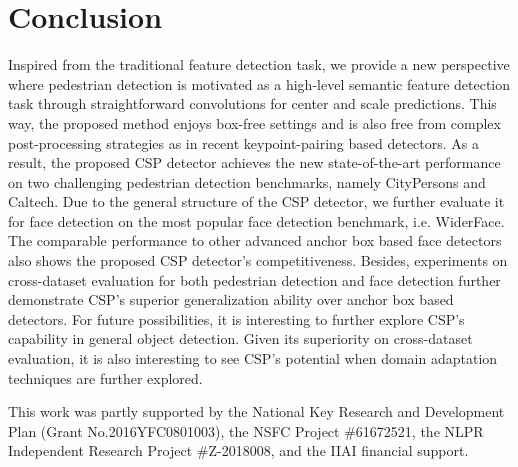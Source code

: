 \section{Conclusion}
Inspired from the traditional feature detection task, we provide a new perspective where pedestrian detection is motivated as a high-level semantic feature detection task through straightforward convolutions for center and scale predictions. This way, the proposed method enjoys box-free settings and is also free from complex post-processing strategies as in recent keypoint-pairing based detectors. As a result, the proposed CSP detector achieves the new state-of-the-art performance on two challenging pedestrian detection benchmarks, namely CityPersons and Caltech.
Due to the general structure of the CSP detector, we further evaluate it for face detection on the most popular face detection benchmark, i.e. WiderFace. The comparable performance to other advanced anchor box based face detectors also shows the proposed CSP detector's competitiveness. Besides, experiments on cross-dataset evaluation for both pedestrian detection and face detection further demonstrate CSP's superior generalization ability over anchor box based detectors. For future possibilities, it is interesting to further explore CSP's capability in general object detection. Given its superiority on cross-dataset evaluation, it is also interesting to see CSP's potential when domain adaptation techniques are further explored.

\begin{acknowledgements}
This work was partly supported by the National Key Research and Development Plan (Grant No.2016YFC0801003), the NSFC Project \#61672521, the NLPR Independent Research Project \#Z-2018008, and the IIAI financial support.
\end{acknowledgements}

         




